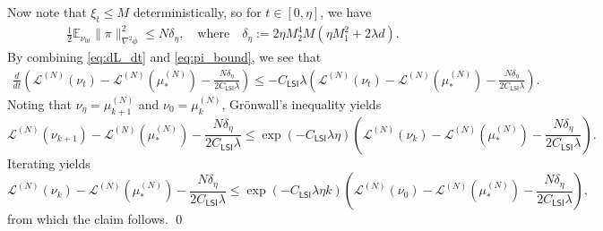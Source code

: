 \documentclass{article}
\newcommand{\CLSI}[0]{C_{\mathsf{LSI}}}
\begin{document}
Now note that $\xi_t\le M$ deterministically, so for $t\in [0, \eta]$, we have
\begin{align*}
\frac{1}{2}\mathbb{E}_{\nu_{0t}}\|\pi\|_{\nabla^2\phi}^2\le N\delta_\eta, \quad\text{where}\quad \delta_\eta:=2\eta M_2^4M(\eta M_1^2 + 2\lambda d).
\end{align*}
By combining \eqref{eq:dL_dt} and \eqref{eq:pi_bound}, we see that \begin{align*}
    \frac{d}{dt}\left(\mathcal{L}^{(N)}(\nu_t) - \mathcal{L}^{(N)}(\mu_*^{(N)}) -\frac{N\delta_\eta}{2\CLSI\lambda}\right)\le -\CLSI\lambda \left(\mathcal{L}^{(N)}(\nu_t) - \mathcal{L}^{(N)}(\mu_*^{(N)}) -\frac{N\delta_\eta}{2\CLSI\lambda}\right).
\end{align*}
Noting that $\nu_\eta =\mu_{k+1}^{(N)}$ and $\nu_0 = \mu_{k}^{(N)}$, Gr\"onwall's inequality yields \[
\mathcal{L}^{(N)}(\nu_{k+1}) - \mathcal{L}^{(N)}(\mu_*^{(N)}) -\frac{N\delta_\eta}{2\CLSI\lambda} \le \exp\left(-\CLSI\lambda\eta\right)\left(\mathcal{L}^{(N)}(\nu_k) - \mathcal{L}^{(N)}(\mu_*^{(N)}) -\frac{N\delta_\eta}{2\CLSI\lambda}\right).
\]
Iterating yields \[
\mathcal{L}^{(N)}(\nu_{k}) - \mathcal{L}^{(N)}(\mu_*^{(N)}) -\frac{N\delta_\eta}{2\CLSI\lambda} \le \exp\left(-\CLSI\lambda\eta k\right)\left(\mathcal{L}^{(N)}(\nu_0) - \mathcal{L}^{(N)}(\mu_*^{(N)}) -\frac{N\delta_\eta}{2\CLSI\lambda}\right),
\]
from which the claim follows.
\qed
\end{document}
